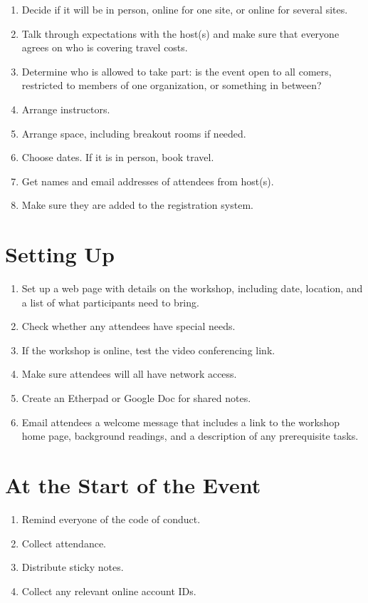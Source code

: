 \begin{enumerate}
\item
  Decide if it will be in person, online for one site, or online for
  several sites.
\item
  Talk through expectations with the host(s) and make sure that
  everyone agrees on who is covering travel costs.
\item
  Determine who is allowed to take part: is the event open to all
  comers, restricted to members of one organization, or something in
  between?
\item
  Arrange instructors.
\item
  Arrange space, including breakout rooms if needed.
\item
  Choose dates. If it is in person, book travel.
\item
  Get names and email addresses of attendees from host(s).
\item
  Make sure they are added to the registration system.
\end{enumerate}

\section{Setting Up}\label{setting-up}

\begin{enumerate}
\item
  Set up a web page with details on the workshop, including date,
  location, and a list of what participants need to bring.
\item
  Check whether any attendees have special needs.
\item
  If the workshop is online, test the video conferencing link.
\item
  Make sure attendees will all have network access.
\item
  Create an Etherpad or Google Doc for shared notes.
\item
  Email attendees a welcome message that includes a link to the
  workshop home page, background readings, and a description of any
  prerequisite tasks.
\end{enumerate}

\section{At the Start of the Event}\label{at-the-start-of-the-event}

\begin{enumerate}
\item
  Remind everyone of the code of conduct.
\item
  Collect attendance.
\item
  Distribute sticky notes.
\item
  Collect any relevant online account IDs.
\end{enumerate}

